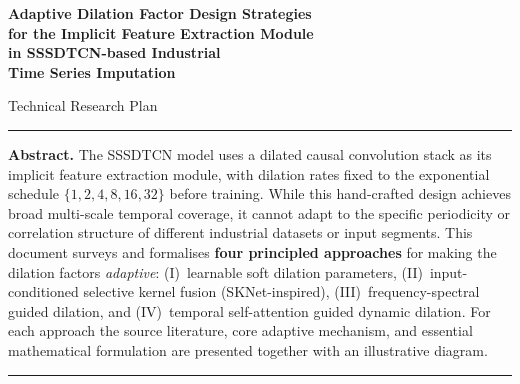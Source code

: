 \documentclass[12pt,a4paper]{article}
\begin{document}

\begin{titlepage}
  \thispagestyle{empty}
  \begin{center}
    \vspace*{3cm}

    {\fontsize{18}{26}\selectfont\bfseries\color{primaryblue}
      Adaptive Dilation Factor Design Strategies\\
      for the Implicit Feature Extraction Module\\
      in SSSDTCN-based Industrial\\
      Time Series Imputation}

    \vspace{1.5cm}

    {\large\color{darkgray} Technical Research Plan}

    \vspace{2cm}

    \rule{0.55\textwidth}{0.5pt}

    \vspace{1.5cm}

    \begin{minipage}{0.82\textwidth}
      \textbf{Abstract.}
      The SSSDTCN model uses a dilated causal convolution stack as its implicit
      feature extraction module, with dilation rates fixed to the exponential
      schedule $\{1,2,4,8,16,32\}$ before training. While this hand-crafted
      design achieves broad multi-scale temporal coverage, it cannot adapt to the
      specific periodicity or correlation structure of different industrial
      datasets or input segments. This document surveys and formalises
      \textbf{four principled approaches} for making the dilation factors
      \emph{adaptive}: (I)~learnable soft dilation parameters, (II)~input-conditioned
      selective kernel fusion (SKNet-inspired), (III)~frequency-spectral guided
      dilation, and (IV)~temporal self-attention guided dynamic dilation. For each
      approach the source literature, core adaptive mechanism, and essential
      mathematical formulation are presented together with an illustrative diagram.
    \end{minipage}

    \vspace{1.5cm}

    \rule{0.55\textwidth}{0.5pt}

  \end{center}
\end{titlepage}
\end{document}
